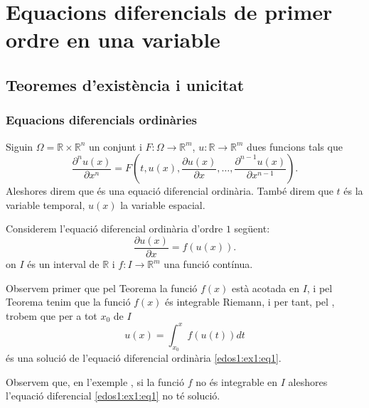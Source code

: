 \documentclass[../Apunts.tex]{subfiles}
\begin{document}
\chapter{Equacions diferencials de primer ordre en una variable}
	\section{Teoremes d'existència i unicitat}
	\subsection{Equacions diferencials ordinàries}
	\begin{definition}
		\label{def:equació diferencial ordinària d'ordre n}
		\label{def:solució de l'equació diferencial ordinària}
		Siguin \(\Omega=\mathbb{R}\times\mathbb{R}^{n}\) un conjunt i \(F\colon\Omega\longrightarrow\mathbb{R}^{m}\), \(u\colon\mathbb{R}\longrightarrow\mathbb{R}^{m}\) dues funcions tals que
		\[\frac{\partial^{n}u(x)}{\partial x^{n}}=F\left(t,u(x),\frac{\partial u(x)}{\partial x},\dots,\frac{\partial^{n-1}u(x)}{\partial x^{n-1}}\right).\]
		Aleshores direm que
		és una equació diferencial ordinària. També direm que \(t\) és la variable temporal, \(u(x)\) la variable espacial.
	\end{definition}
	\begin{example}
		\label{ex:edos1:1}
		Considerem l'equació diferencial ordinària d'ordre \(1\) següent:
		\begin{equation}
			\label{edos1:ex1:eq1}
			\frac{\partial u(x)}{\partial x}=f(u(x)).
		\end{equation}
		on \(I\) és un interval de \(\mathbb{R}\) i \(f\colon I\longrightarrow\mathbb{R}^{m}\) una funció contínua.
		\begin{solution}
			Observem primer que pel Teorema  la funció \(f(x)\) està acotada en \(I\), i pel Teorema  tenim que la funció \(f(x)\) és integrable Riemann, i per tant, pel , trobem que per a tot \(x_{0}\) de \(I\)
			\[u(x)=\int_{x_{0}}^{x}f(u(t))dt\]
			és una solució de l'equació diferencial ordinària \eqref{edos1:ex1:eq1}.
		\end{solution}
	\end{example}
	\begin{observation}
		Observem que, en l'exemple , si la funció \(f\) no és integrable en \(I\) aleshores l'equació diferencial \eqref{edos1:ex1:eq1} no té solució. %
	\end{observation}
\end{document}
